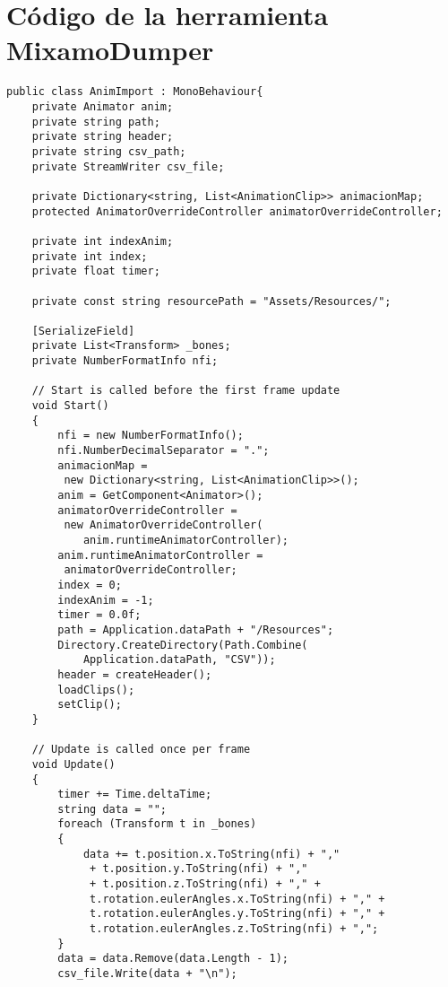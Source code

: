\chapter{Código de la herramienta MixamoDumper}
\label{appendix:MixamoDumperCode}

\begin{lstlisting}[style=customcsharp, caption={Código de la herramienta MixamoDumper}, label={lst:MixamoDumperCode}]
public class AnimImport : MonoBehaviour{
    private Animator anim;
    private string path;
    private string header;
    private string csv_path;
    private StreamWriter csv_file;

    private Dictionary<string, List<AnimationClip>> animacionMap;
    protected AnimatorOverrideController animatorOverrideController;

    private int indexAnim;
    private int index;
    private float timer;

    private const string resourcePath = "Assets/Resources/";

    [SerializeField]
    private List<Transform> _bones;
    private NumberFormatInfo nfi;

    // Start is called before the first frame update
    void Start()
    {
        nfi = new NumberFormatInfo();
        nfi.NumberDecimalSeparator = ".";
        animacionMap = 
         new Dictionary<string, List<AnimationClip>>();
        anim = GetComponent<Animator>();
        animatorOverrideController =
         new AnimatorOverrideController(
            anim.runtimeAnimatorController);
        anim.runtimeAnimatorController = 
         animatorOverrideController;
        index = 0;
        indexAnim = -1;
        timer = 0.0f;
        path = Application.dataPath + "/Resources";
        Directory.CreateDirectory(Path.Combine(
            Application.dataPath, "CSV"));
        header = createHeader();
        loadClips();
        setClip();
    }

    // Update is called once per frame
    void Update()
    {
        timer += Time.deltaTime;
        string data = "";
        foreach (Transform t in _bones)
        {
            data += t.position.x.ToString(nfi) + ","
             + t.position.y.ToString(nfi) + "," 
             + t.position.z.ToString(nfi) + "," + 
             t.rotation.eulerAngles.x.ToString(nfi) + "," + 
             t.rotation.eulerAngles.y.ToString(nfi) + "," + 
             t.rotation.eulerAngles.z.ToString(nfi) + ",";
        }
        data = data.Remove(data.Length - 1);
        csv_file.Write(data + "\n");



\end{lstlisting}
